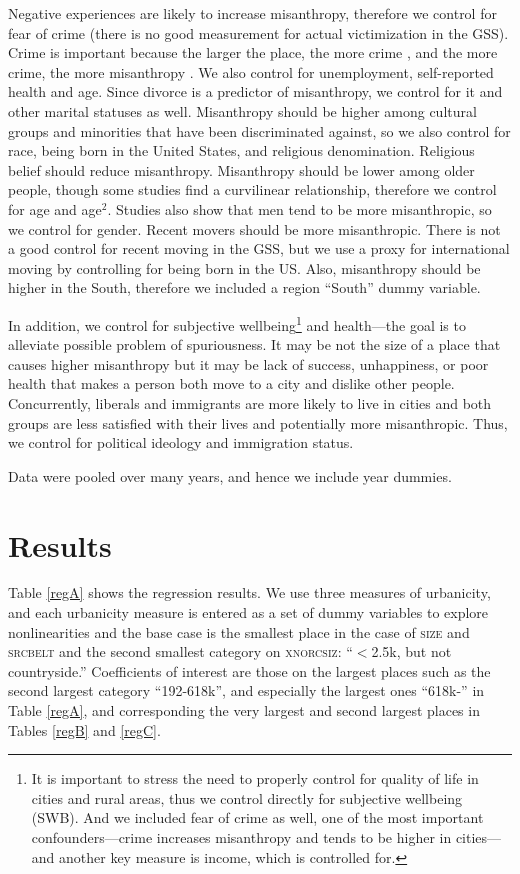 \documentclass[11pt, letterpaper]{article}
\begin{document}
\begin{spacing}{1.4}
Negative experiences are likely to increase misanthropy, therefore we control for fear of crime (there is no good measurement for actual victimization in the GSS). Crime is important because the larger the place, the more crime \citep{bettencourt10b}, and the more crime, the more misanthropy \citep{wilson85}. We also control for unemployment, self-reported health and age. Since divorce is a predictor of misanthropy, we control for it and other marital statuses as well.  Misanthropy should be higher among cultural groups and minorities that have been discriminated against, so we also control for race, being born in the United States, and religious denomination. Religious belief should reduce misanthropy. Misanthropy should be lower among older people, though some studies find a curvilinear relationship, therefore we control for age and age$^2$. Studies also show that men tend to be more misanthropic, so we control for gender. Recent movers should be more misanthropic. There is not a good control for recent moving in the GSS, but we use a proxy for international moving by controlling for being born in the US. Also, misanthropy should be higher in the South, therefore we included a region ``South'' dummy variable.

In addition, we control for subjective wellbeing\footnote{It is important to stress the need to properly control for quality of life in cities and rural areas, thus we control directly for subjective wellbeing (SWB). And we included fear of crime as well, one of the most important confounders---crime increases misanthropy and tends to be higher in cities---and another key measure is income, which is controlled for.} and health---the goal is to alleviate possible problem of spuriousness. It may be not the size of a place that causes higher misanthropy but it may be lack of success, unhappiness, or poor health that makes a person both move to a city and dislike other people. Concurrently, liberals and immigrants are more likely to live in cities and both groups are less satisfied with their lives \citep{aok11a,aokJap14} and potentially more misanthropic. Thus, we control for political ideology and immigration status.

Data were pooled over many years, and hence we include year dummies. 

\section*{Results}

Table \ref{regA} shows the regression results. We use three measures of
urbanicity, and each urbanicity measure is entered as a set of dummy variables to
explore nonlinearities and the base case is the smallest place in the case of
\textsc{size} and \textsc{srcbelt} and the second smallest category on \textsc{xnorcsiz}:
 ``$<$2.5k, but not countryside.'' Coefficients of interest are those on the
 largest  places such as the second largest category ``192-618k'', and especially the largest ones ``618k-'' in Table
\ref{regA}, and corresponding the very largest and second largest places in Tables
\ref{regB} and \ref{regC}.


\end{spacing}
\end{document}
